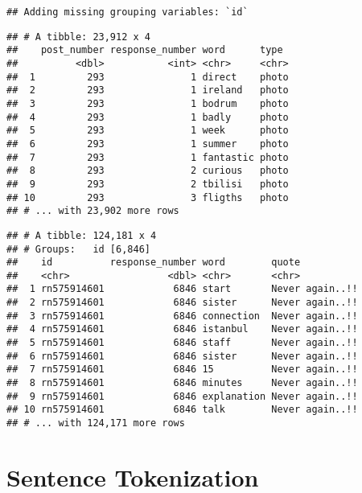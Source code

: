 \documentclass[]{article}
\newenvironment{Shaded}{\begin{snugshade}}{\end{snugshade}}
\newcommand{\KeywordTok}[1]{\textcolor[rgb]{0.13,0.29,0.53}{\textbf{#1}}}
\newcommand{\StringTok}[1]{\textcolor[rgb]{0.31,0.60,0.02}{#1}}
\newcommand{\OperatorTok}[1]{\textcolor[rgb]{0.81,0.36,0.00}{\textbf{#1}}}
\newcommand{\NormalTok}[1]{#1}
\begin{document}
\begin{verbatim}
## Adding missing grouping variables: `id`
\end{verbatim}

\begin{verbatim}
## # A tibble: 23,912 x 4
##    post_number response_number word      type 
##          <dbl>           <int> <chr>     <chr>
##  1         293               1 direct    photo
##  2         293               1 ireland   photo
##  3         293               1 bodrum    photo
##  4         293               1 badly     photo
##  5         293               1 week      photo
##  6         293               1 summer    photo
##  7         293               1 fantastic photo
##  8         293               2 curious   photo
##  9         293               2 tbilisi   photo
## 10         293               3 fligths   photo
## # ... with 23,902 more rows
\end{verbatim}

\begin{Shaded}
\end{Shaded}

\begin{verbatim}
## # A tibble: 124,181 x 4
## # Groups:   id [6,846]
##    id          response_number word        quote          
##    <chr>                 <dbl> <chr>       <chr>          
##  1 rn575914601            6846 start       Never again..!!
##  2 rn575914601            6846 sister      Never again..!!
##  3 rn575914601            6846 connection  Never again..!!
##  4 rn575914601            6846 istanbul    Never again..!!
##  5 rn575914601            6846 staff       Never again..!!
##  6 rn575914601            6846 sister      Never again..!!
##  7 rn575914601            6846 15          Never again..!!
##  8 rn575914601            6846 minutes     Never again..!!
##  9 rn575914601            6846 explanation Never again..!!
## 10 rn575914601            6846 talk        Never again..!!
## # ... with 124,171 more rows
\end{verbatim}

\section{Sentence Tokenization}\label{sentence-tokenization}
\end{document}
